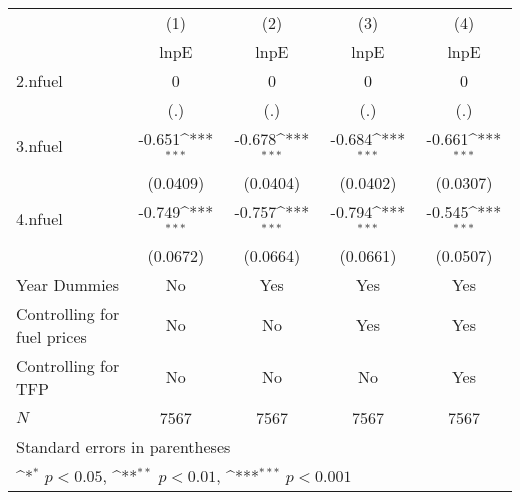 {
\def\sym#1{\ifmmode^{#1}\else\(^{#1}\)\fi}
\begin{tabular}{l*{4}{c}}
\hline\hline
            &\multicolumn{1}{c}{(1)}&\multicolumn{1}{c}{(2)}&\multicolumn{1}{c}{(3)}&\multicolumn{1}{c}{(4)}\\
            &\multicolumn{1}{c}{lnpE}&\multicolumn{1}{c}{lnpE}&\multicolumn{1}{c}{lnpE}&\multicolumn{1}{c}{lnpE}\\
\hline
2.nfuel     &           0         &           0         &           0         &           0         \\
            &         (.)         &         (.)         &         (.)         &         (.)         \\
[1em]
3.nfuel     &      -0.651\sym{***}&      -0.678\sym{***}&      -0.684\sym{***}&      -0.661\sym{***}\\
            &    (0.0409)         &    (0.0404)         &    (0.0402)         &    (0.0307)         \\
[1em]
4.nfuel     &      -0.749\sym{***}&      -0.757\sym{***}&      -0.794\sym{***}&      -0.545\sym{***}\\
            &    (0.0672)         &    (0.0664)         &    (0.0661)         &    (0.0507)         \\
[1em]
Year Dummies &          No         &         Yes         &         Yes         &         Yes         \\
[1em]
Controlling for fuel prices &          No         &          No         &         Yes         &         Yes         \\
[1em]
Controlling for TFP &          No         &          No         &          No         &         Yes         \\
\hline
\(N\)       &        7567         &        7567         &        7567         &        7567         \\
\hline\hline
\multicolumn{5}{l}{\footnotesize Standard errors in parentheses}\\
\multicolumn{5}{l}{\footnotesize \sym{*} \(p<0.05\), \sym{**} \(p<0.01\), \sym{***} \(p<0.001\)}\\
\end{tabular}
}
